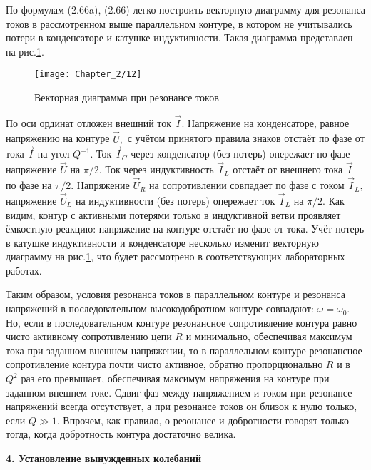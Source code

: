 {По формулам (2.66a), (2.66) легко построить векторную диаграмму для резонанса токов в рассмотренном выше параллельном контуре, в котором не учитывались потери в конденсаторе и катушке индуктивности. Такая диаграмма представлен на рис.\ref{fig8}.

\begin{figure}[h!]
	\centering\texttt{[image: Chapter\_2/12]}
	\caption{Векторная диаграмма при резонансе токов}
	\label{fig8}
\end{figure}

По оси ординат отложен внешний ток $\vec I.$ Напряжение на конденсаторе, равное напряжению на контуре $\vec U,$ с учётом принятого правила знаков отстаёт по фазе от тока $\vec I$ на угол $Q^{-1}.$ Ток $\vec I_C$ через конденсатор (без потерь) опережает по фазе напряжение $\vec U$ на $\pi/2.$ Ток через индуктивность $\vec I_L$ отстаёт от внешнего тока $\vec I$ по фазе на $\pi/2.$  Напряжение $\vec U_R$ на сопротивлении совпадает по фазе с током $\vec I_L,$ напряжение $\vec U_L$ на индуктивности (без потерь) опережает ток $\vec I_L$ на $\pi/2.$ Как видим, контур с активными потерями только в индуктивной ветви проявляет ёмкостную реакцию: напряжение на контуре отстаёт по фазе от тока. Учёт потерь в катушке индуктивности и конденсаторе несколько изменит векторную диаграмму на рис.\ref{fig8}, что будет рассмотрено в соответствующих лабораторных работах.

Таким образом, условия резонанса токов в параллельном контуре и резонанса напряжений в последовательном высокодобротном контуре совпадают: $\omega=\omega_0.$ Но, если в последовательном контуре резонансное сопротивление контура равно чисто активному сопротивлению цепи $R$ и минимально, обеспечивая максимум тока при заданном внешнем напряжении, то в параллель\-ном контуре резонансное сопротивление контура почти чисто активное, обратно пропорцио\-нально $R$ и в $Q^2$ раз его превышает, обеспечивая максимум напряжения на контуре при задан\-ном внешнем токе. Сдвиг фаз между напряжением и током при резонансе напряжений всегда отсутствует, а при резонансе токов он близок к нулю только, если $Q\gg1.$ Впрочем, как правило, о резонансе и добротности говорят только тогда, когда добротность контура достаточно велика.

\begin{center}
\textbf{4. Установление вынужденных колебаний}
\end{center}

}
